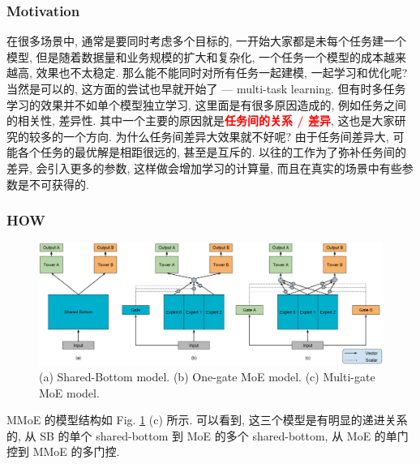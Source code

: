 \subsubsection{Motivation}
在很多场景中, 通常是要同时考虑多个目标的, 一开始大家都是未每个任务建一个模型, 但是随着数据量和业务规模的扩大和复杂化, 一个任务一个模型的成本越来越高, 效果也不太稳定. 那么能不能同时对所有任务一起建模, 一起学习和优化呢? 当然是可以的, 这方面的尝试也早就开始了 --- multi-task learning. 但有时多任务学习的效果并不如单个模型独立学习, 这里面是有很多原因造成的, 例如任务之间的相关性, 差异性. 其中一个主要的原因就是\textcolor{red}{\textbf{任务间的关系 / 差异}}, 这也是大家研究的较多的一个方向. 为什么任务间差异大效果就不好呢? 由于任务间差异大, 可能各个任务的最优解是相距很远的, 甚至是互斥的. 以往的工作为了弥补任务间的差异, 会引入更多的参数, 这样做会增加学习的计算量, 而且在真实的场景中有些参数是不可获得的.

\subsubsection{HOW}

\begin{figure}[h]
	\centering
	\includegraphics[width=.85\textwidth]{pics/mmoe.jpg}
	\caption{(a) Shared-Bottom model. (b) One-gate MoE model. (c) Multi-gate MoE model.}
	\label{fig:mmoe}
\end{figure}

MMoE 的模型结构如 Fig. \ref{fig:mmoe} (c) 所示. 可以看到, 这三个模型是有明显的递进关系的, 从 SB 的单个 shared-bottom 到 MoE 的多个 shared-bottom, 从 MoE 的单门控到 MMoE 的多门控. 
